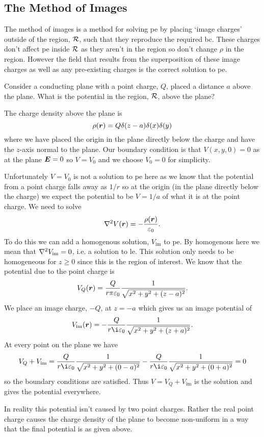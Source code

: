     \subsection{The Method of Images}
    The method of images is a method for solving \acrshort{pe} by placing `image charges' outside of the region, \(\mathcal{R}\), such that they reproduce the required \acrshort{bc}.
    These charges don't affect \acrshort{pe} inside \(\mathcal{R}\) as they aren't in the region so don't change \(\rho\) in the region.
    However the field that results from the superposition of these image charges as well as any pre-existing charges is the correct solution to \acrshort{pe}.
    
    \begin{example}
        Consider a conducting plane with a point charge, \(Q\), placed a distance \(a\) above the plane.
        What is the potential in the region, \(\mathcal{R}\), above the plane?
        
        The charge density above the plane is
        \[\rho(\bm{r}) = Q\delta(z - a)\delta(x)\delta(y)\]
        where we have placed the origin in the plane directly below the charge and have the \(z\)-axis normal to the plane.
        Our boundary condition is that \(V(x, y, 0) = 0\) as at the plane \(\bm{E} = 0\) so \(V = V_0\) and we choose \(V_0 = 0\) for simplicity.
        
        Unfortunately \(V = V_0\) is not a solution to \acrshort{pe} here as we know that the potential from a point charge falls away as \(1/r\) so at the origin (in the plane directly below the charge) we expect the potential to be \(V = 1/a\) of what it is at the point charge.
        We need to solve
        \[\nabla^2 V(\bm{r}) = -\frac{\rho(\bm{r})}{\varepsilon_0}.\]
        To do this we can add a homogenous solution, \(V_\text{im}\) to \acrshort{pe}.
        By homogenous here we mean that \(\nabla^2 V_\text{im} = 0\), i.e. a solution to \acrshort{le}.
        This solution only needs to be homogeneous for \(z \ge 0\) since this is the region of interest.
        We know that the potential due to the point charge is
        \[V_Q(\bm{r}) = \frac{Q}{r\pi\varepsilon_0}\frac{1}{\sqrt{x^2 + y^2 + (z - a)^2}}.\]
        We place an image charge, \(-Q\), at \(z = -a\) which gives us an image potential of
        \[V_\text{im}(\vv{r}) = -\frac{Q}{r\i\varepsilon_0}\frac{1}{\sqrt{x^2 + y^2 + (z + a)^2}}.\]
        At every point on the plane we have
        \[V_Q + V_\text{im} = \frac{Q}{r\i\varepsilon_0}\frac{1}{\sqrt{x^2 + y^2 + (0 - a)^2}} - \frac{Q}{r\i\varepsilon_0}\frac{1}{\sqrt{x^2 + y^2 + (0 + a)^2}} = 0\]
        so the boundary conditions are satisfied.
        Thus \(V = V_Q + V_\text{im}\) is the solution and gives the potential everywhere.
        
        In reality this potential isn't caused by two point charges.
        Rather the real point charge causes the charge density of the plane to become non-uniform in a way that the final potential is as given above.
    \end{example}
    
